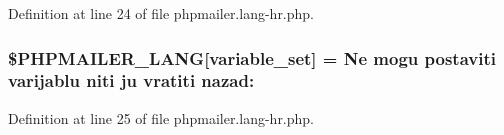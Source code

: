 Definition at line 24 of file phpmailer.\+lang-\/hr.\+php.

\subsubsection[{\texorpdfstring{\$\+P\+H\+P\+M\+A\+I\+L\+E\+R\+\_\+\+L\+A\+NG}{$PHPMAILER_LANG}}]{\setlength{\rightskip}{0pt plus 5cm}\$P\+H\+P\+M\+A\+I\+L\+E\+R\+\_\+\+L\+A\+NG\mbox{[}\textquotesingle{}variable\+\_\+set\textquotesingle{}\mbox{]} = \textquotesingle{}Ne mogu postaviti varijablu niti ju vratiti nazad\+: \textquotesingle{}}\hypertarget{phpmailer_8lang-hr_8php_af795debc7a739d038742691c358d9032}{}\label{phpmailer_8lang-hr_8php_af795debc7a739d038742691c358d9032}


Definition at line 25 of file phpmailer.\+lang-\/hr.\+php.


